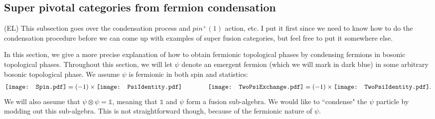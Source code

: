 \documentclass[12pt,a4paper]{article}
\newcommand{\tp}{\otimes}
\newcommand{\unit}{\mathds{1}}
\newcommand{\ethan}[1]{{\color{amethyst}\footnotesize{(EL) #1}}}
\newcommand{\Spin}{\mathord{\vcenter{\hbox{\texttt{[image: Spin.pdf]}}}}}
\newcommand{\PsiIdentity}{\mathord{\vcenter{\hbox{\texttt{[image: PsiIdentity.pdf]}}}}}
\newcommand{\TwoPsiExchange}{\mathord{\vcenter{\hbox{\texttt{[image: TwoPsiExchange.pdf]}}}}}
\newcommand{\TwoPsiIdentity}{\mathord{\vcenter{\hbox{\texttt{[image: TwoPsiIdentity.pdf]}}}}}
\begin{document}
\subsection{Super pivotal categories from fermion condensation} \label{carefully_condensing_psi}

\ethan{This subsection goes over the condensation process and $pin^+(1)$ action, etc. I put it first since we need to know how to do the condensation procedure before we can come up with examples of super fusion categories, but feel free to put it somewhere else.}

In this section, we give a more precise explanation of how to obtain fermionic topological phases by condensing fermions in bosonic topological phases.
Throughout this section, we will let $\psi$ denote an emergent fermion (which we will mark in dark blue) in some arbitrary bosonic topological phase. 
We assume $\psi$ is fermionic in both spin and statistics:
\begin{align} \label{psiafermion}
\Spin = (-1) \times  \PsiIdentity
\qquad \qquad \TwoPsiExchange =  (-1) \times\TwoPsiIdentity.
\end{align}
We will also assume that $\psi\tp\psi=\unit$, meaning that $\unit$ and $\psi$ form a fusion sub-algebra.
We would like to ``condense" the $\psi$ particle by modding out this sub-algebra.
This is not straightforward though, because of the fermionic nature of $\psi$. 
\end{document}
